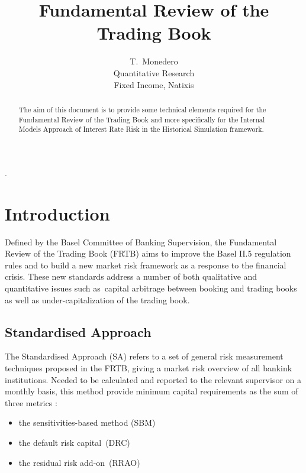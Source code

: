 \documentclass[3pt]{article}
\begin{document}
\title{Fundamental Review of the Trading Book}
\author{T.\ Monedero \\
Quantitative Research\\
Fixed Income, Natixis\\
}
\maketitle

\begin{abstract}
The aim of this document is to provide some technical elements required for
the Fundamental Review of the Trading Book and more specifically for the
Internal Models Approach of Interest Rate Risk in the Historical Simulation
framework.
\end{abstract}

\tableofcontents

.

\bigskip

\bigskip

\bigskip

\section{Introduction}

Defined by the Basel Committee of Banking Supervision, the Fundamental
Review of the Trading Book (FRTB) aims to improve the Basel II.5 regulation
rules and to build a new market risk framework as a response to the
financial crisis. These new standards address a number of both qualitative
and quantitative issues such as\ capital arbitrage between booking and
trading books as well as under-capitalization of the trading book.

\subsection{Standardised Approach}

The Standardised Approach (SA) refers to a set of general risk measurement
techniques proposed in the FRTB, giving a market risk overview of all
bankink institutions. Needed to be calculated and reported to the relevant
supervisor on a monthly basis, this method provide minimum capital
requirements as the sum of three metrics :

\bigskip

\begin{itemize}
\item the sensitivities-based method (SBM)

\item the default risk capital\ (DRC)

\item the residual risk add-on\ (RRAO)
\end{itemize}
\end{document}
